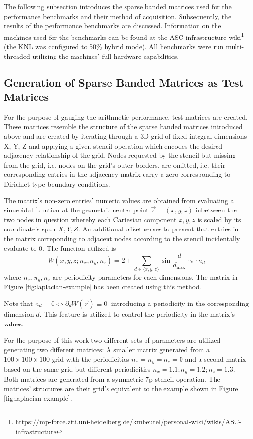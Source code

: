 \documentclass{article}
\begin{document}
  The following subsection introduces the sparse banded matrices used for the performance benchmarks and their method of acquisition. Subsequently, the results of the performance benchmarks are discussed. Information on the machines used for the benchmarks can be found at the ASC infrastructure wiki\footnote{https://mp-force.ziti.uni-heidelberg.de/kmbeutel/personal-wiki/wikis/ASC-infrastructure} (the KNL was configured to 50\% hybrid mode). All benchmarks were run multi-threaded utilizing the machines' full hardware capabilities.

  \subsection{Generation of Sparse Banded Matrices as Test Matrices}

    For the purpose of gauging the arithmetic performance, test matrices are created. These matrices resemble the structure of the sparse banded matrices introduced above and are created by iterating through a 3D grid of fixed integral dimensions X, Y, Z and applying a given stencil operation which encodes the desired adjacency relationship of the grid. Nodes requested by the stencil but missing from the grid, i.e. nodes on the grid's outer borders, are omitted, i.e. their corresponding entries in the adjacency matrix carry a zero corresponding to Dirichlet-type boundary conditions.

    The matrix's non-zero entries' numeric values are obtained from evaluating a sinusoidal function at the geometric center point $\vec{r} = (x, y, z)$ inbetween the two nodes in question whereby each Cartesian component $x, y, z$ is scaled by its coordinate's span $X, Y, Z$. An additional offset serves to prevent that entries in the matrix correponding to adjacent nodes according to the stencil incidentally evaluate to 0. The function utilized is $$W(x,y,z; n_x, n_y, n_z) = 2 + \sum \limits_{d \in \{x,y,z\}} \sin{\frac{d}{d_{\text{max}}} \cdot \pi \cdot n_d} $$ where $n_x, n_y, n_z$ are periodicity parameters for each dimensions. The matrix in Figure \ref{fig:laplacian-example} has been created using this method.

    Note that $n_d = 0 \Leftrightarrow \partial_d W(\vec{r}) \equiv 0$, introducing a periodicity in the corresponding dimension $d$. This feature is utilized to control the periodicity in the matrix's values.

    For the purpose of this work two different sets of parameters are utilized generating two different matrices: A smaller matrix generated from a $100 \times 100 \times 100$ grid with the periodicities $n_x = n_y = n_z = 0$ and a second matrix based on the same grid but different periodicities $n_x = 1.1; n_y = 1.2; n_z = 1.3$. Both matrices are generated from a symmetric 7p-stencil operation. The matrices' structures are their grid's equivalent to the example shown in Figure \ref{fig:laplacian-example}.
\end{document}
